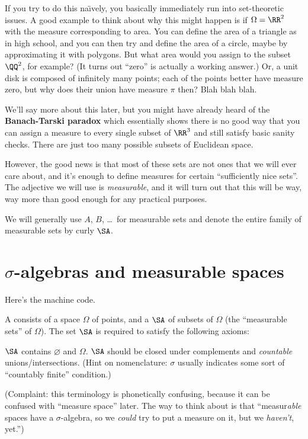 If you try to do this na\"{\i}vely,
you basically immediately run into set-theoretic issues.
A good example to think about why this might happen
is if $\Omega = \RR^2$ with the measure corresponding to area.
You can define the area of a triangle as in high school,
and you can then try and define the area of a circle,
maybe by approximating it with polygons.
But what area would you assign to the subset $\QQ^2$, for example?
(It turns out ``zero'' is actually a working answer.)
Or, a unit disk is composed of infinitely many points;
each of the points better have measure zero,
but why does their union have measure $\pi$ then?
Blah blah blah.

We'll say more about this later, but
you might have already heard of the \textbf{Banach-Tarski paradox}
which essentially shows there is no good way that you can assign a
measure to every single subset of $\RR^3$
and still satisfy basic sanity checks.
There are just too many possible subsets of Euclidean space.

However, the good news is that most of these sets are not ones
that we will ever care about,
and it's enough to define measures for certain
``sufficiently nice sets''.
The adjective we will use is \emph{measurable},
and it will turn out that this will be way, way more than good enough
for any practical purposes.

We will generally use $A$, $B$, \dots\ for measurable sets
and denote the entire family of measurable sets by curly $\SA$.

\section{$\sigma$-algebras and measurable spaces}
Here's the machine code.
\begin{definition}
	A  consists of a space $\Omega$ of points,
	and a  $\SA$ of subsets of $\Omega$
	(the ``measurable sets'' of $\Omega$).
	The set $\SA$ is required to satisfy the following axioms:
	\begin{itemize}
		\ii $\SA$ contains $\varnothing$ and $\Omega$.
		\ii $\SA$ should be closed under complements and
		\emph{countable} unions/intersections.
		(Hint on nomenclature: $\sigma$ usually indicates
		some sort of ``countably finite'' condition.)
	\end{itemize}
\end{definition}
(Complaint: this terminology is phonetically confusing,
because it can be confused with ``measure space'' later.
The way to think about is that
``measur\emph{able} spaces have a $\sigma$-algebra, so we \emph{could}
try to put a measure on it, but we \emph{haven't}, yet.'')

